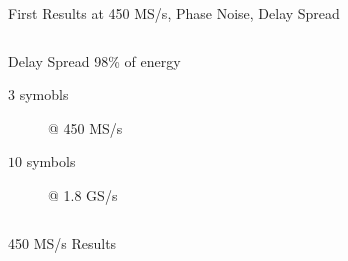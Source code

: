 \documentclass[10pt]{beamer}
\begin{document}
\begin{frame}{First Results at 450 MS/s, Phase Noise, Delay Spread}
\begin{columns}[T]
\begin{column}{.5\textwidth}
      \begin{block}{Delay Spread}
        98\% of energy
        \begin{description}
        \item[$3$ symobls] @ 450 MS/s
        \item[$10$ symbols] @ 1.8 GS/s
        \end{description}
      \end{block}
    \end{column}
  \end{columns}
\end{frame}

\begin{frame}{450 MS/s Results}
  \begin{columns}[T]
    \begin{column}{.5\textwidth}

\end{column}
\end{columns}
\end{frame}
\end{document}
